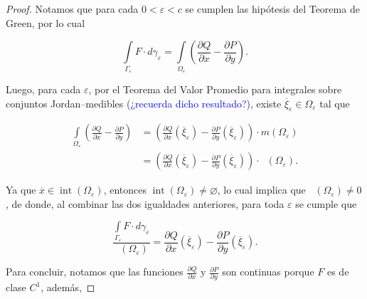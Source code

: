 \documentclass[
]{krantz}
\theoremstyle{definition}
\renewcommand{\epsilon}{\varepsilon}  %
\renewcommand{\emptyset}{\varnothing}  %
\theoremstyle{definition}
\theoremstyle{definition}
\theoremstyle{definition}
\theoremstyle{remark}
\begin{document}
\begin{proof}

Notamos que para cada \(0< \epsilon<c\) se cumplen las hipótesis del Teorema de Green, por lo cual

\begin{equation*}
            \displaystyle \int\limits_{\Gamma_{\epsilon}} F\cdot d\gamma_{\epsilon} = \int\limits_{\Omega_{\epsilon}} \left( \frac{\partial Q}{\partial x} - \frac{\partial P}{\partial y} \right).
\end{equation*}

Luego, para cada \(\epsilon\), por el Teorema del Valor Promedio para integrales sobre conjuntos Jordan--medibles (\textcolor{blue}{¿recuerda dicho resultado?}), existe \(\overline{\xi}_{\epsilon}\in \Omega_{\epsilon}\) tal que

\begin{align*}
            \int\limits_{\Omega_{\epsilon}} \left( \frac{\partial Q}{\partial x} - \frac{\partial P}{\partial y} \right) & = \left( \frac{\partial Q}{\partial x}\left(\overline{\xi}_{\epsilon}\right) - \frac{\partial P}{\partial y}\left(\overline{\xi}_{\epsilon}\right) \right) \cdot m\left( \Omega_{\epsilon}\right) \\
            & = \left( \frac{\partial Q}{\partial x}\left(\overline{\xi}_{\epsilon}\right) - \frac{\partial P}{\partial y}\left(\overline{\xi}_{\epsilon}\right) \right) \cdot \mathop{\mathrm{\acute{a}rea}}\left( \Omega_{\epsilon}\right).
\end{align*}

Ya que \(\overline{x}\in\mathop{\mathrm{int}}\left(\Omega_{\epsilon}\right)\), entonces \(\mathop{\mathrm{int}}\left(\Omega_{\epsilon}\right)\neq\emptyset\), lo cual implica que \(\mathop{\mathrm{\acute{a}rea}}\left(\Omega_{\epsilon}\right)\neq 0\), de donde, al combinar las dos igualdades anteriores, para toda \(\epsilon\) se cumple que

\begin{equation*}
        \frac{\displaystyle\int\limits_{\Gamma_{\epsilon}} F\cdot d\gamma_{\epsilon}}{\mathop{\mathrm{\acute{a}rea}}\left(\Omega_{\epsilon}\right)} = \frac{\partial Q}{\partial x}\left(\overline{\xi}_{\epsilon}\right) - \frac{\partial P}{\partial y}\left( \overline{\xi}_{\epsilon}\right).
\end{equation*}

Para concluir, notamos que las funciones \(\frac{\partial Q}{\partial x}\) y \(\frac{\partial P}{\partial y}\) son continuas porque \(F\) es de clase \(C^1\), además,


\end{proof}
\end{document}
